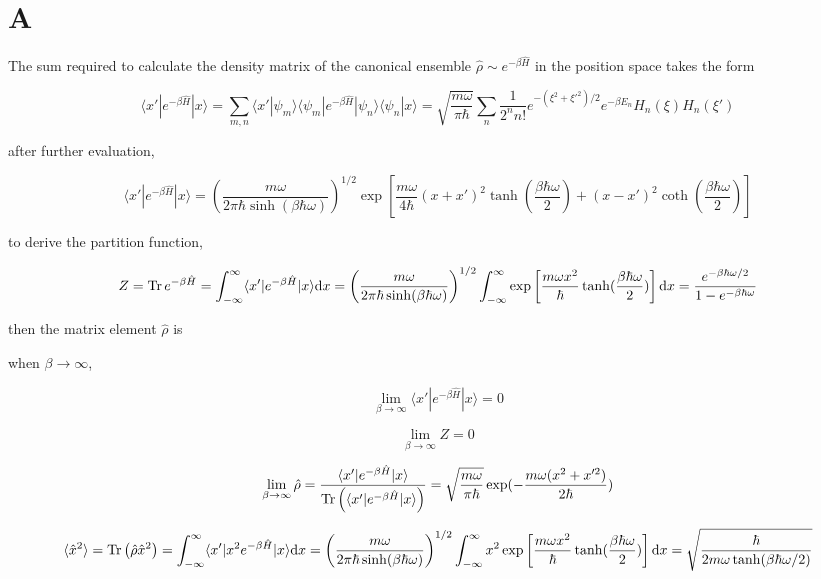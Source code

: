 \section*{A}

The sum required to calculate the density matrix of the canonical ensemble $\hat{\rho}\sim e^{-\beta\hat{H}}$ in the position space takes the form

\begin{equation}
    \langle x'|e^{-\beta\hat{H}}|x\rangle = \sum_{m,n}\langle x'|\psi_m\rangle\langle\psi_m|e^{-\beta\hat{H}}|\psi_n\rangle\langle\psi_n|x\rangle=\sqrt{\frac{m\omega}{\pi\hbar}}\sum_n\frac{1}{2^nn!}e^{-(\xi^2+\xi'^2)/2}e^{-\beta E_n}H_n(\xi)H_n(\xi')
\end{equation}

after further evaluation,

\begin{equation}
    \langle x'|e^{-\beta\hat{H}}|x\rangle = \left(\frac{m\omega}{2\pi\hbar\sinh(\beta\hbar\omega)}\right)^{1/2} \exp\left[\frac{m\omega}{4\hbar}(x+x')^2\tanh(\frac{\beta\hbar\omega}{2})+(x-x')^2\coth(\frac{\beta\hbar\omega}{2})\right]
\end{equation}

to derive the partition function, 

\begin{equation}
    Z = \operatorname{Tr} e^{-\beta\hat{H}} = \int_{-\infty}^{\infty}\langle x'|e^{-\beta\hat{H}}|x\rangle\mathrm{d}x = \left(\frac{m\omega}{2\pi\hbar\sinh(\beta\hbar\omega)}\right)^{1/2} \int_{-\infty}^{\infty} \exp\left[\frac{m\omega x^2}{\hbar}\tanh(\frac{\beta\hbar\omega}{2})\right]\mathrm{d}x = \frac{e^{-\beta\hbar\omega/2}}{1-e^{-\beta\hbar\omega}}
\end{equation}

then the matrix element $\hat{\rho}$ is

when $\beta\rightarrow\infty$,

\begin{equation}
    \lim_{\beta\rightarrow\infty}\langle x'|e^{-\beta\hat{H}}|x\rangle = 0
\end{equation}

\begin{equation}
    \lim_{\beta\rightarrow\infty}Z = 0
\end{equation}

\begin{equation}
    \lim_{\beta\rightarrow\infty}\hat{\rho} = \frac{\langle x'|e^{-\beta\hat{H}}|x\rangle}{\operatorname{Tr}\left(\langle x'|e^{-\beta\hat{H}}|x\rangle\right)} = \sqrt{\frac{m\omega}{\pi\hbar}}\exp(-\frac{m\omega(x^2+x'^2)}{2\hbar})
\end{equation}

\begin{equation}
    \langle \hat{x}^2\rangle = \operatorname{Tr}\left(\hat{\rho}\hat{x}^2\right) = \int_{-\infty}^{\infty}\langle x'|x^2e^{-\beta\hat{H}}|x\rangle\mathrm{d}x = \left(\frac{m\omega}{2\pi\hbar\sinh(\beta\hbar\omega)}\right)^{1/2} \int_{-\infty}^{\infty} x^2\exp\left[\frac{m\omega x^2}{\hbar}\tanh(\frac{\beta\hbar\omega}{2})\right]\mathrm{d}x = \sqrt{\frac{\hbar}{2m\omega\tanh(\beta\hbar\omega/2)}}
\end{equation}
